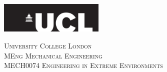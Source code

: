 \begin{titlepage}

  \newcommand{\HRule}{\rule{\linewidth}{0.5mm}} %

  \center
  \includegraphics[width=5cm]{Title/UCL.png}\\[1cm] %


  \center %


  \textsc{\LARGE University College London }\\[1.5cm] %
  \textsc{\Large MEng Mechanical Engineering  }\\[0.5cm] %
  \textsc{\large MECH0074 Engineering in Extreme Environments }\\[1.5cm] %

  \makeatletter
  { \huge \textsc \@title}\\[1.5cm] %




\end{titlepage}
